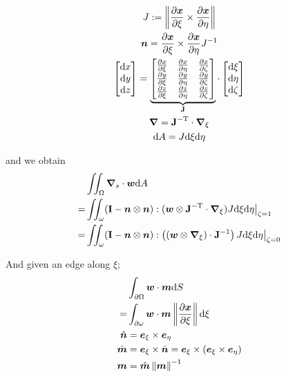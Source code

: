 \documentclass[a4paper,11pt]{article}
\renewcommand{\to}[1]{\text{\boldmath $#1$}} %
\newcommand{\ts}[1]{\text{\boldmath $\mathrm{#1}$}} %
\newcommand{\intd}[1]{\mathrm{d}#1}
\newcommand{\pderiv}[2]{\frac{\partial#1}{\partial#2}}
\newcommand{\norm}[1]{\left\lVert{#1}\right\rVert}
\newcommand{\T}{\mathrm{T}}
\newcommand{\defeq}{:=}
\begin{document}
\begin{gather}
 J \defeq \norm{\pderiv{\to x}{\xi} \times  \pderiv{\to x}{\eta}}\\
 \to n = \pderiv{\to x}{\xi} \times \pderiv{\to x}{\eta} J^{-1}\\
 \begin{bmatrix}\intd x\\ \intd y\\ \intd z\end{bmatrix} =
  \underbrace{\begin{bmatrix}\pderiv{x}{\xi} & \pderiv{x}{\eta} & \pderiv{x}{\zeta}\\
	  \pderiv{y}{\xi} & \pderiv{y}{\eta} & \pderiv{y}{\zeta}\\
	  \pderiv{z}{\xi} & \pderiv{z}{\eta} & \pderiv{z}{\zeta} \end{bmatrix}}_{\ts J}
  \cdot \begin{bmatrix}\intd \xi \\ \intd \eta \\ \intd \zeta\end{bmatrix}\\
 \to\nabla = \ts J^{-\T}\cdot\to\nabla_\xi\\
 \intd A = J \intd \xi \intd \eta 
\end{gather}

and we obtain
\begin{align}
 &\iint_\Omega\to \nabla_s\cdot\to w\intd A\\
=&\iint_\omega(\ts I-\to n\otimes\to n):(\to w\otimes \ts J^{-\T}\cdot\to\nabla_\xi)J\intd\xi\intd\eta\big|_{\zeta=1}\\
=&\iint_\omega(\ts I-\to n\otimes\to n):\left((\to w\otimes\to\nabla_\xi) \cdot\ts J^{-1}\right)J\intd\xi\intd\eta\big|_{\zeta=0}
\end{align}

And given an edge along $\xi$;
\begin{align}
 &\int_{\partial\Omega}\to w\cdot\to m\intd S\\
=&\int_{\partial\omega}\to w\cdot\to m\norm{\pderiv{\to x}{\xi}}\intd \xi\\
 \hat{\to n} &= \to e_\xi \times \to e_\eta\\
 \hat{\to m} &= \to e_\xi \times \hat{\to n} = \to e_\xi\times (\to e_\xi \times \to e_\eta)\\
 \to m &= \hat{\to m}\norm{\to m}^{-1}
\end{align}
\end{document}
